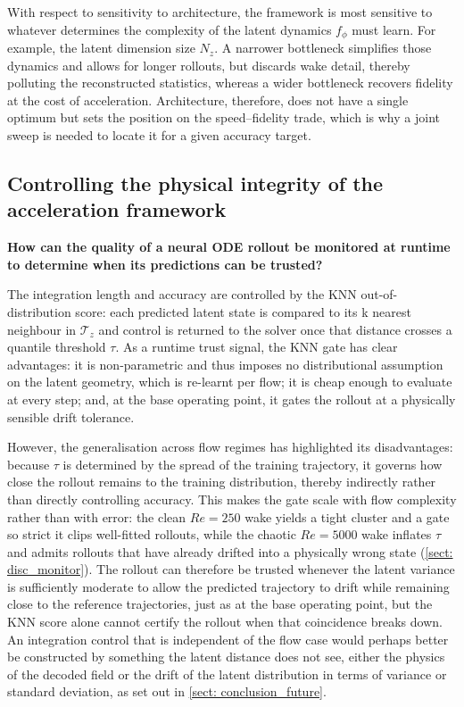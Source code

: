 With respect to sensitivity to architecture, the framework is most sensitive to whatever determines the complexity of the latent dynamics $f_\phi$ must learn. For example, the latent dimension size $N_z$. A narrower bottleneck simplifies those dynamics and allows for longer rollouts, but discards wake detail, thereby polluting the reconstructed statistics, whereas a wider bottleneck recovers fidelity at the cost of acceleration. Architecture, therefore, does not have a single optimum but sets the position on the speed--fidelity trade, which is why a joint sweep is needed to locate it for a given accuracy target.

\subsection{Controlling the physical integrity of the acceleration framework}
\noindent\textbf{How can the quality of a neural ODE rollout be monitored at runtime to determine when its predictions can be trusted?}

The integration length and accuracy are controlled by the KNN out-of-distribution score: each predicted latent state is compared to its k nearest neighbour in $\boldsymbol{\mathcal{T}}_z$ and control is returned to the solver once that distance crosses a quantile threshold $\tau$. As a runtime trust signal, the KNN gate has clear advantages: it is non-parametric and thus imposes no distributional assumption on the latent geometry, which is re-learnt per flow; it is cheap enough to evaluate at every step; and, at the base operating point, it gates the rollout at a physically sensible drift tolerance. 

However, the generalisation across flow regimes has highlighted its disadvantages: because $\tau$ is determined by the spread of the training trajectory, it governs how close the rollout remains to the training distribution, thereby indirectly rather than directly controlling accuracy. This makes the gate scale with flow complexity rather than with error: the clean $Re=250$ wake yields a tight cluster and a gate so strict it clips well-fitted rollouts, while the chaotic $Re=5000$ wake inflates $\tau$ and admits rollouts that have already drifted into a physically wrong state (\autoref{sect: disc_monitor}). The rollout can therefore be trusted whenever the latent variance is sufficiently moderate to allow the predicted trajectory to drift while remaining close to the reference trajectories, just as at the base operating point, but the KNN score alone cannot certify the rollout when that coincidence breaks down. An integration control that is independent of the flow case would perhaps better be constructed by something the latent distance does not see, either the physics of the decoded field or the drift of the latent distribution in terms of variance or standard deviation, as set out in \autoref{sect: conclusion_future}.


